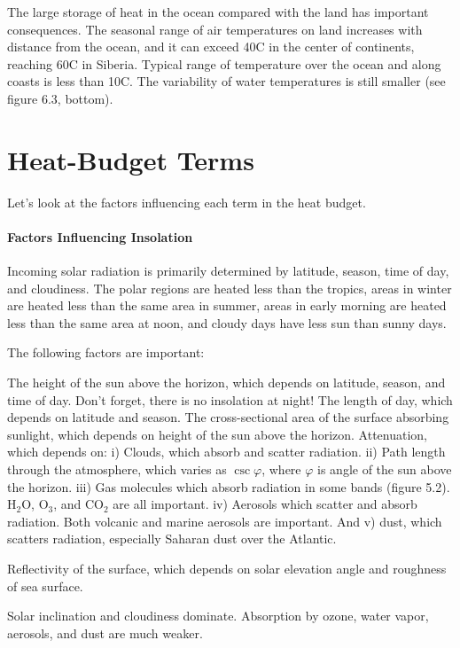The large storage of heat in the ocean compared with the land has important
consequences. The seasonal range of air temperatures on land increases with
distance from the ocean, and it can exceed 40\degrees C in the center of
continents, reaching 60\degrees C in Siberia. Typical range of temperature over
the ocean and along coasts is less than 10\degrees C. The variability of water
temperatures is still smaller (see figure 6.3, bottom).

\section{Heat-Budget Terms}
Let's look at the factors influencing
each term in the heat budget.

\paragraph{Factors Influencing Insolation}
Incoming solar radiation is primarily determined
by latitude, season, time of day, and cloudiness. The polar
regions are heated less than the tropics, areas in winter are
heated less than the same area in summer, areas in early morning
are heated less than the same area at noon, and cloudy days have
less sun than sunny days.

The following factors are important:
\begin{enumerate}
\vitem
The height of the sun above the horizon, which depends on
latitude, season, and time of day. Don't forget, there is no insolation at
night!
\vitem
The length of day, which depends on latitude and season.
\vitem
The cross-sectional area of the surface absorbing sunlight, which depends on
height of the sun above the horizon.
\vitem
Attenuation, which depends on:
i) Clouds, which absorb and scatter radiation. ii) Path length through the atmosphere, which varies as
$\csc \varphi$, where $\varphi$ is angle of the sun above the horizon. iii) Gas molecules which absorb
radiation in some bands (figure 5.2). H$_2$O, O$_3$, and CO$_2$ are all important. iv) Aerosols which
scatter and absorb radiation. Both volcanic and marine aerosols are important. And v) dust, which scatters
radiation, especially Saharan dust over the Atlantic.

\vitem
Reflectivity of the surface, which depends on solar elevation angle and roughness
of sea surface.
\end{enumerate}
Solar inclination and cloudiness dominate. Absorption by ozone, water
vapor, aerosols, and dust are much weaker.

